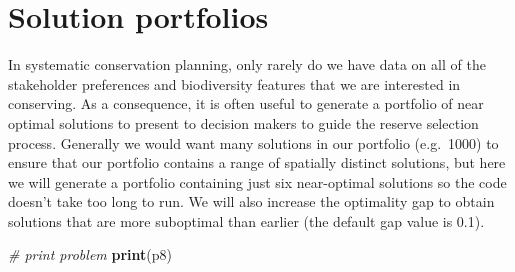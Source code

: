 \documentclass[12pt,]{book}
\newenvironment{Shaded}{\begin{snugshade}}{\end{snugshade}}
\newcommand{\KeywordTok}[1]{\textcolor[rgb]{0.13,0.29,0.53}{\textbf{#1}}}
\newcommand{\DataTypeTok}[1]{\textcolor[rgb]{0.13,0.29,0.53}{#1}}
\newcommand{\DecValTok}[1]{\textcolor[rgb]{0.00,0.00,0.81}{#1}}
\newcommand{\FloatTok}[1]{\textcolor[rgb]{0.00,0.00,0.81}{#1}}
\newcommand{\StringTok}[1]{\textcolor[rgb]{0.31,0.60,0.02}{#1}}
\newcommand{\CommentTok}[1]{\textcolor[rgb]{0.56,0.35,0.01}{\textit{#1}}}
\newcommand{\OtherTok}[1]{\textcolor[rgb]{0.56,0.35,0.01}{#1}}
\newcommand{\OperatorTok}[1]{\textcolor[rgb]{0.81,0.36,0.00}{\textbf{#1}}}
\newcommand{\NormalTok}[1]{#1}
\begin{document}
\section{Solution portfolios}\label{solution-portfolios}

In systematic conservation planning, only rarely do we have data on all
of the stakeholder preferences and biodiversity features that we are
interested in conserving. As a consequence, it is often useful to
generate a portfolio of near optimal solutions to present to decision
makers to guide the reserve selection process. Generally we would want
many solutions in our portfolio (e.g.~1000) to ensure that our portfolio
contains a range of spatially distinct solutions, but here we will
generate a portfolio containing just six near-optimal solutions so the
code doesn't take too long to run. We will also increase the optimality
gap to obtain solutions that are more suboptimal than earlier (the
default gap value is 0.1).

\begin{Shaded}
\end{Shaded}

\clearpage

\begin{Shaded}
\begin{Highlighting}[]
\CommentTok{# print problem}
\KeywordTok{print}\NormalTok{(p8)}
\end{Highlighting}
\end{Shaded}
\end{document}
